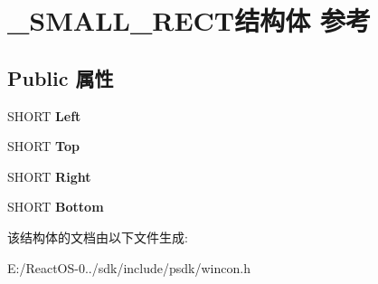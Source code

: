\hypertarget{struct___s_m_a_l_l___r_e_c_t}{}\section{\+\_\+\+S\+M\+A\+L\+L\+\_\+\+R\+E\+C\+T结构体 参考}
\label{struct___s_m_a_l_l___r_e_c_t}
\subsection*{Public 属性}
\begin{DoxyCompactItemize}
\item 
\mbox{\label{struct___s_m_a_l_l___r_e_c_t_aa47fd8aed88a7aff7a6a26a394594db8}} 
S\+H\+O\+RT {\bfseries Left}
\item 
\mbox{\label{struct___s_m_a_l_l___r_e_c_t_a62f17d4e17287f1a0918a5daae34a391}} 
S\+H\+O\+RT {\bfseries Top}
\item 
\mbox{\label{struct___s_m_a_l_l___r_e_c_t_a6da21705b7ff12b30002d6958cb98db4}} 
S\+H\+O\+RT {\bfseries Right}
\item 
\mbox{\label{struct___s_m_a_l_l___r_e_c_t_ac275e9867e198d3e881568165ddf73ce}} 
S\+H\+O\+RT {\bfseries Bottom}
\end{DoxyCompactItemize}


该结构体的文档由以下文件生成\+:\begin{DoxyCompactItemize}
\item 
E\+:/\+React\+O\+S-\/0../sdk/include/psdk/wincon.\+h\end{DoxyCompactItemize}
